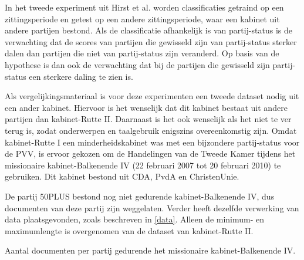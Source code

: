 In het tweede experiment uit Hirst et al. worden classificaties getraind op een zittingsperiode en getest op een andere zittingsperiode, waar een kabinet uit andere partijen bestond. Als de classificatie afhankelijk is van partij-status is de verwachting dat de scores van partijen die gewisseld zijn van partij-status sterker dalen dan partijen die niet van partij-status zijn veranderd. Op basis van de hypothese is dan ook de verwachting dat bij de partijen die gewisseld zijn partij-status een sterkere daling te zien is.\par
Als vergelijkingsmateriaal is voor deze experimenten een tweede dataset nodig uit een ander kabinet. Hiervoor is het wenselijk dat dit kabinet bestaat uit andere partijen dan kabinet-Rutte II. Daarnaast is het ook wenselijk als het niet te ver terug is, zodat onderwerpen en taalgebruik enigszins overeenkomstig zijn. Omdat kabinet-Rutte I een minderheidskabinet was met een bijzondere partij-status voor de PVV, is ervoor gekozen om de Handelingen van de Tweede Kamer tijdens het missionaire kabinet-Balkenende IV (22 februari 2007 tot 20 februari 2010) te gebruiken. Dit kabinet bestond uit CDA, PvdA en ChristenUnie.\par
De partij 50PLUS bestond nog niet gedurende kabinet-Balkenende IV, dus documenten van deze partij zijn weggelaten. Verder heeft dezelfde verwerking van data plaatsgevonden, zoals beschreven in \ref{data}. Alleen de minimum- en maximumlengte is overgenomen van de dataset van kabinet-Rutte II.\par

\begin{table}[H]
\label{aantallenBal}
\caption{Aantal documenten per partij gedurende het missionaire kabinet-Balkenende IV.}
\centering

\end{table}

